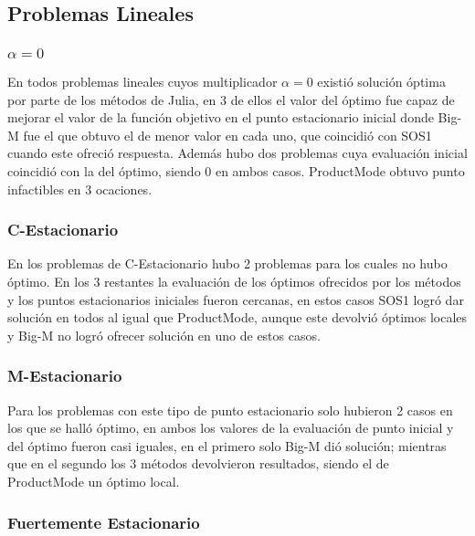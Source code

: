 \subsection{Problemas Lineales} 
  

\subsubsection{$\alpha =0$}

En todos problemas lineales cuyos multiplicador $\alpha=0$ existió solución óptima 
por parte de los métodos de Julia, en 3 de ellos el valor del óptimo fue capaz de mejorar el valor de la función objetivo en el punto estacionario inicial donde Big-M fue el que obtuvo el de menor valor en cada uno, que coincidió con SOS1 cuando este ofreció respuesta. Además hubo dos problemas cuya evaluación inicial coincidió con la del óptimo, siendo 0 en ambos casos. ProductMode obtuvo punto infactibles en 3 ocaciones. 




\subsubsection{C-Estacionario}

En los problemas de C-Estacionario hubo 2 problemas para los cuales no hubo óptimo. En los 3 restantes la evaluación de los óptimos ofrecidos por los métodos y los puntos estacionarios iniciales fueron cercanas, en estos casos SOS1 logró dar solución en todos al igual que ProductMode, aunque este devolvió óptimos locales y   Big-M no logró ofrecer solución en uno de estos casos.


 

\subsubsection{M-Estacionario}

Para los problemas con este tipo de punto estacionario solo hubieron 2 casos en los que se halló óptimo, en ambos los valores de la evaluación de punto inicial y del óptimo fueron casi iguales, en el primero solo Big-M dió solución; mientras que en el segundo los 3 métodos devolvieron resultados, siendo el de ProductMode un óptimo local.  
  
\subsubsection{Fuertemente Estacionario}

